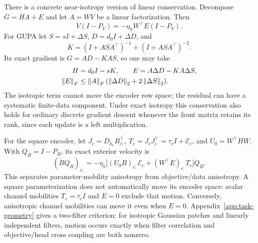 There is a concrete near-isotropy version of linear conservation. Decompose $G=HA+E$ and let $A=WV$ be a linear factorization. Then
\begin{equation}
 \dot V(I-P_V)=-\eta_VW^\top E(I-P_V).
 \label{eq:linear-leakage}
\end{equation}
For GUPA let $S=sI+\Delta S$, $D=d_0I+\Delta D$, and
\begin{equation}
 K=(I+ASA^\top)^{-1}+(I+ASA^\top)^{-2}.
\end{equation}
Its exact gradient is $G=AD-KAS$, so one may take
\begin{align}
 H&=d_0I-sK,\qquad E=A\Delta D-KA\Delta S,\\
 \left\lVert E\right\rVert_F&\le\left\lVert A\right\rVert_F(\left\lVert \Delta D\right\rVert_2+2\left\lVert \Delta S\right\rVert_2).
 \label{eq:gupa-residual}
\end{align}
The isotropic term cannot move the encoder row space; the residual can have a systematic finite-data component. Under exact isotropy this conservation also holds for ordinary discrete gradient descent whenever the front matrix retains its rank, since each update is a left multiplication.

For the square encoder, let $J_c=D_{h_c}B_{c:}^\top$, $T_c=J_cJ_c^\top=\tau_c I+\mathcal E_c$, and $U_0=W^\top HW$. With $Q_B=I-P_B$, its exact exterior velocity is
\begin{equation}
 (\dot BQ_B)_{c:}=-\eta_h\big[(U_0B)_{c:}\mathcal E_c
 +(W^\top E)_{c:}T_c\big]Q_B.
 \label{eq:square-leakage}
\end{equation}
This separates parameter-mobility anisotropy from objective/data anisotropy. A square parameterization does not automatically move its encoder space: scalar channel mobilities $T_c=\tau_cI$ and $E=0$ exclude that motion. Conversely, anisotropic channel mobilities can move it even when $E=0$. Appendix~\ref{app:task-geometry} gives a two-filter criterion: for isotropic Gaussian patches and linearly independent filters, motion occurs exactly when filter correlation and objective/head cross coupling are both nonzero.



